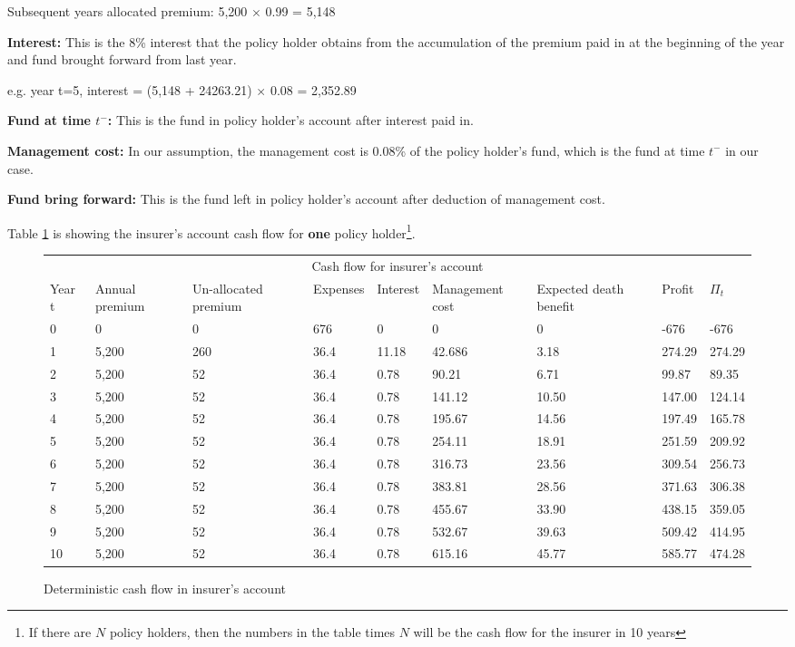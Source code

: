 \documentclass{report}
\begin{document}
Subsequent years allocated premium:   5,200 $\times$ 0.99 = 5,148


\textbf{Interest:} This is the 8\% interest that the policy holder obtains from the accumulation of the premium paid in at the beginning of the year and fund brought forward from last year.

e.g.  year t=5, interest = (5,148 + 24263.21) $\times$ 0.08 = 2,352.89

\textbf{Fund at time $t^-$:} This is the fund in policy holder's account after interest paid in.

\textbf{Management cost:} In our assumption, the management cost is 0.08\% of the policy holder's fund, which is the fund at time $t^-$ in our case. 

\textbf{Fund bring forward:} This is the fund left in policy holder's account after deduction of management cost. 


Table \ref{determ-insurer} is showing the insurer's account cash flow for \textbf{one} policy holder\footnote{If there are $N$ policy holders, then the numbers in the table times $N$ will be the cash flow for the insurer in 10 years}. 


\begin{figure}[H]
\hfill
    \centering
\begin{tabular}{p{0.8cm} p{1.5cm} p{1.5cm} p{1.2cm} p{1cm} p{2cm}p{1.5cm} p{1.5cm} p{1.5cm} }
\toprule
\multicolumn{9}{c}{Cash flow for insurer's account} \\
\cmidrule(r){3-7}

Year t & Annual premium & Un-allocated premium & Expenses & Interest &Management cost& Expected death benefit & Profit& $\Pi_t$  \\
\midrule

0&0&0&676&0&0&0&-676&-676\\
1&5,200&260&36.4&11.18&42.686&3.18&274.29&274.29\\
2&5,200&52&36.4&0.78&90.21&6.71&99.87&89.35\\
3&5,200&52&36.4&0.78&141.12&10.50&147.00&124.14\\
4&5,200&52&36.4&0.78&195.67&14.56&197.49&165.78\\
5&5,200&52&36.4&0.78&254.11&18.91&251.59&209.92\\
6&5,200&52&36.4&0.78&316.73&23.56&309.54&256.73\\
7&5,200&52&36.4&0.78&383.81&28.56&371.63&306.38\\
8&5,200&52&36.4&0.78&455.67&33.90&438.15&359.05\\
9&5,200&52&36.4&0.78&532.67&39.63&509.42&414.95\\
10&5,200&52&36.4&0.78&615.16&45.77&585.77&474.28\\

\bottomrule
\end{tabular}
\caption{Deterministic cash flow in insurer's account}
\label{determ-insurer}
\end{figure}
\end{document}
